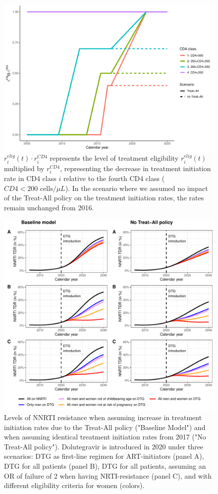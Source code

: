 \documentclass{article}
\begin{document}
\begin{figure}[h!]
\centering
   \includegraphics[width=14cm]{../figures/dtg_plot_treatrate2.pdf}
   \caption{$r^{elig}_i(t) \cdot r^{CD4}_i$ represents the level of treatment eligibility $r^{elig}_i(t)$ multiplied by $r^{CD4}_i$, representing the decrease in treatment initiation rate in CD4 class $i$ relative to the fourth CD4 class ($CD4<200 \text{ cells}/\mu L$). In the scenario where we assumed no impact of the Treat-All policy on the treatment initiation rates, the rates remain unchanged from 2016.}\label{fig1_notreatall}
\end{figure}

\begin{figure}[h!]
\centering
   \includegraphics[width=16cm]{../figures/sens_notreatall.pdf}
   \caption{Levels of NNRTI resistance when assuming increase in treatment initiation rates due to the Treat-All policy ("Baseline Model") and when assuming identical treatment initiation rates from 2017 ("No Treat-All policy"). Dolutegravir is introduced in 2020 under three scenarios: DTG as first-line regimen for ART-initiators (panel A), DTG for all patients (panel B), DTG for all patients, assuming an OR of failure of 2 when having NRTI-resistance (panel C), and with different eligibility criteria for women (colors).}\label{fig2_notreatall}
\end{figure}
\newpage
\end{document}
